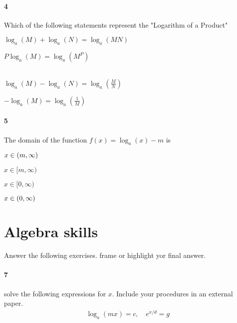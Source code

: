 \documentclass[main.tex]{subfiles}
\begin{document}
\paragraph{4} Which of the following statements represent the "Logarithm of a Product"

\begin{enumerate*}
    \item $\log_a(M)+\log_a(N) = \log_a(MN)\quad$
    \item $P\log_a(M)=\log_a(M^P)$ \\\\
    \item $\log_a(M)-\log_a(N)=\log_a(\frac{M}{N})\quad$
    \item $-\log_a(M)=\log_a(\frac{1}{M})\quad$
\end{enumerate*}

\paragraph{5} The domain of the function $f(x)=\log_a(x)-m$ is

\begin{enumerate*}
    \item $x\in\qty(m,\infty)\quad$
    \item $x\in[m,\infty)\quad$
    \item $x\in[0,\infty)\quad$
    \item $x\in\qty(0,\infty)\quad$
\end{enumerate*}



\section{Algebra skills}
Answer the following exercises. frame or highlight yor final answer.

\paragraph{7} solve the following expressions for $x$.
Include your procedures in an external paper.
\begin{gather*}
    \log_a(mx) = c,\quad e^{x/d}=g
\end{gather*}
\end{document}
